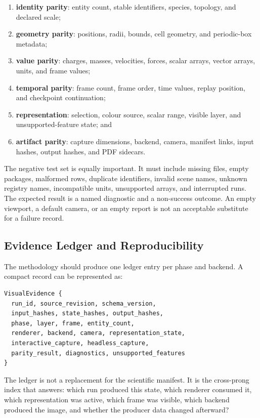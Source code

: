 \documentclass[11pt,a4paper]{article}
\begin{document}
\begin{enumerate}
  \item \textbf{identity parity}: entity count, stable identifiers, species,
        topology, and declared scale;
  \item \textbf{geometry parity}: positions, radii, bounds, cell geometry,
        and periodic-box metadata;
  \item \textbf{value parity}: charges, masses, velocities, forces, scalar
        arrays, vector arrays, units, and frame values;
  \item \textbf{temporal parity}: frame count, frame order, time values,
        replay position, and checkpoint continuation;
  \item \textbf{representation}: selection, colour source, scalar
        range, visible layer, and unsupported-feature state; and
  \item \textbf{artifact parity}: capture dimensions, backend, camera,
        manifest links, input hashes, output hashes, and PDF sidecars.
\end{enumerate}

The negative test set is equally important.  It must include missing files,
empty packages, malformed rows, duplicate identifiers, invalid scene names,
unknown registry names, incompatible units, unsupported arrays, and interrupted
runs.  The expected result is a named diagnostic and a non-success outcome.
An empty viewport, a default camera, or an empty report is not an acceptable
substitute for a failure record.

\subsection{Evidence Ledger and Reproducibility}

The methodology should produce one ledger entry per phase and backend.  A
compact record can be represented as:

\begin{lstlisting}[style=cpp]
VisualEvidence {
  run_id, source_revision, schema_version,
  input_hashes, state_hashes, output_hashes,
  phase, layer, frame, entity_count,
  renderer, backend, camera, representation_state,
  interactive_capture, headless_capture,
  parity_result, diagnostics, unsupported_features
}
\end{lstlisting}

The ledger is not a replacement for the scientific manifest.  It is the
cross-prong index that answers: which run produced this state, which renderer
consumed it, which representation was active, which frame was visible, which
backend produced the image, and whether the producer data changed afterward?
\end{document}

